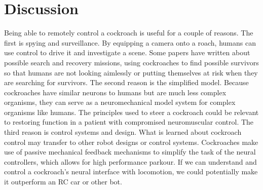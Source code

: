\section{Discussion}
\label{sec:discussion}

Being able to remotely control a cockroach is useful for a couple of reasons. The first is spying and surveillance. By equipping a camera onto a roach, humans can use control to drive it and investigate a scene. Some papers have written about possible search and recovery missions, using cockroaches to find possible survivors so that humans are not looking aimlessly or putting themselves at risk when they are searching for survivors. The second reason is the simplified model. Because cockroaches have similar neurons to humans but are much less complex organisms, they can serve as a neuromechanical model system for complex organisms like humans. The principles used to steer a cockroach could be relevant to restoring function in a patient with compromised neuromuscular control. The third reason is control systems and design. What is learned about cockroach control may transfer to other robot designs or control systems. Cockroaches make use of passive mechanical feedback mechanisms to simplify the task of the neural controllers, which allows for high performance parkour. If we can understand and control a cockroach's neural interface with locomotion, we could potentially make it outperform an RC car or other bot.